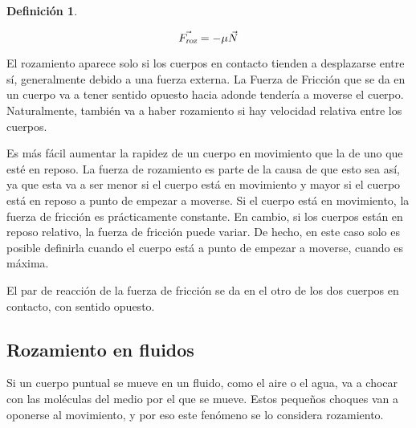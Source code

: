 \documentclass[a5paper,12pt,twoside]{book}
\newtheorem{defn}{{Definición}}[chapter]
\begin{document}
\begin{mdframed}[style=MyFrame1]
    \begin{defn}
    \end{defn}
    \begin{equation*}
        \Vec{{{F}_\textsl{{roz}}}} = - \mu \Vec{N}
    \end{equation*}
\end{mdframed}

El rozamiento aparece solo si los cuerpos en contacto tienden a desplazarse entre sí, generalmente debido a una fuerza externa.
La Fuerza de Fricción que se da en un cuerpo va a tener sentido opuesto hacia adonde tendería a moverse el cuerpo.
Naturalmente, también va a haber rozamiento si hay velocidad relativa entre los cuerpos.

\begin{center}
    \def\svgwidth{0.7\linewidth}
    
\end{center}

Es más fácil aumentar la rapidez de un cuerpo en movimiento que la de uno que esté en reposo.
La fuerza de rozamiento es parte de la causa de que esto sea así, ya que esta va a ser menor si el cuerpo está en movimiento y mayor si el cuerpo está en reposo a punto de empezar a moverse.
Si el cuerpo está en movimiento, la fuerza de fricción es prácticamente constante.
En cambio, si los cuerpos están en reposo relativo, la fuerza de fricción puede variar.
De hecho, en este caso solo es posible definirla cuando el cuerpo está a punto de empezar a moverse, cuando es máxima.

\begin{center}
    \def\svgwidth{0.7\linewidth}
    
\end{center}

El par de reacción de la fuerza de fricción se da en el otro de los dos cuerpos en contacto, con sentido opuesto.

\begin{center}
    \def\svgwidth{0.7\linewidth}
    
\end{center}


\subsection{Rozamiento en fluidos}

Si un cuerpo puntual se mueve en un fluido, como el aire o el agua, va a chocar con las moléculas del medio por el que se mueve.
Estos pequeños choques van a oponerse al movimiento, y por eso este fenómeno se lo considera rozamiento.
\end{document}
